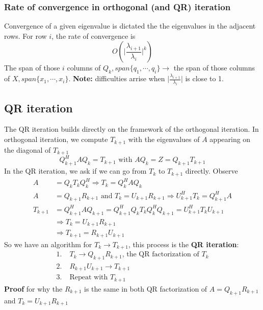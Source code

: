 \documentclass{article}
\newcommand{\abs}[1]{\lvert#1\rvert}
\begin{document}
\subsubsection{Rate of convergence in orthogonal (and QR) iteration}
Convergence of a given eigenvalue is dictated the the eigenvalues in the adjacent rows. For row $i$, the rate of convergence is
\begin{equation*}
    O(\abs{\frac{\lambda_{i+1}}{\lambda_i}}^k)
\end{equation*}
The span of those $i$ columns of $Q_k, span\{q_1, \cdots, q_i\} \longrightarrow$ the span of those columns of $X, span \{x_1, \cdots, x_i\}$. \textbf{Note:} difficulties arrise when $\abs{\frac{\lambda_{i+1}}{\lambda_i}}$ is close to 1.

\subsection{QR iteration}
The QR iteration builds directly on the framework of the orthogonal iteration. In orthogonal iteration, we compute $T_{k+1}$ with the eigenvalues of $A$ appearing on the diagonal of $T_{k+1}$
\begin{equation*}
    Q_{k+1}^HAQ_k = T_{k+1} \textrm{ with }AQ_k = Z = Q_{k+1}T_{k+1}
\end{equation*} 
In the QR iteration, we ask if we can go from $T_k$ to $T_{k+1}$ directly. Observe
\begin{align*}
    A &= Q_k T_k Q_k^H \Longrightarrow T_k = Q_k^HAQ_k\\
    A &= Q_{k+1}R_{k+1} \textrm{ and } T_k = U_{k+1}R_{k+1} \Longrightarrow U_{k+1}^HT_k = Q_{k+1}^HA\\
    T_{k+1} &= Q_{k+1}^HAQ_{k+1} = Q_{k+1}^HQ_kT_kQ_k^HQ_{k+1} = U_{k+1}^H T_k U_{k+1}\\
    &\Rightarrow T_k = U_{k+1} R_{k+1}\\
    &\Rightarrow T_{k+1} = R_{k+1} U_{k+1}
\end{align*} 
So we have an algorithm for $T_k \rightarrow T_{k+1}$, this process is the \textbf{QR iteration}:
\begin{align*}
    1. \;& T_k \longrightarrow Q_{k+1}R_{k+1} \textrm{, the QR factorization of } T_k\\
    2. \;&R_{k+1}U_{k+1} \longrightarrow T_{k+1}\\
    3. \;&\textrm{Repeat with } T_{k+1}
\end{align*}
\textbf{Proof} for why the $R_{k+1}$ is the same in both QR factorization of $A = Q_{k+1}R_{k+1}$ and $T_k = U_{k+1}R_{k+1}$
\end{document}
